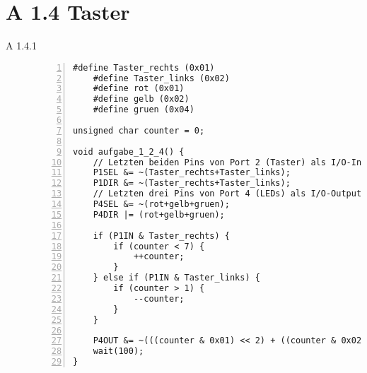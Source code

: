 \documentclass[11pt,a4paper,ngerman]{article}
\begin{document}
\section*{A 1.4 Taster}
\begin{description}
\item[A 1.4.1]

\begin{lstlisting}[numbers=left]
	#define Taster_rechts (0x01)
	#define Taster_links (0x02)
	#define rot (0x01)
	#define gelb (0x02)
	#define gruen (0x04)
	
unsigned char counter = 0;
	
void aufgabe_1_2_4() {
	// Letzten beiden Pins von Port 2 (Taster) als I/O-Input verwenden
	P1SEL &= ~(Taster_rechts+Taster_links);
	P1DIR &= ~(Taster_rechts+Taster_links);
	// Letzten drei Pins von Port 4 (LEDs) als I/O-Output verwenden
	P4SEL &= ~(rot+gelb+gruen);
	P4DIR |= (rot+gelb+gruen);
	
	if (P1IN & Taster_rechts) {
		if (counter < 7) {
			++counter;
		}
	} else if (P1IN & Taster_links) {
		if (counter > 1) {
			--counter;
		}
	}
	
	P4OUT &= ~(((counter & 0x01) << 2) + ((counter & 0x02) << 1) + (counter & 0x04))
	wait(100);
}
\end{lstlisting}
\end{description}
\label{LastPage}
\end{document}
